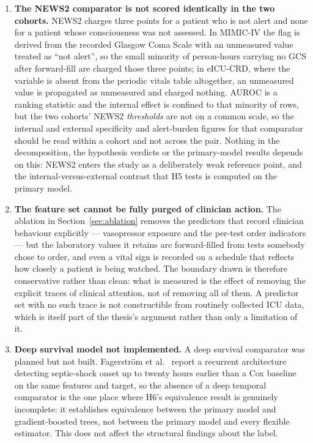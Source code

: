 \begin{enumerate}
    \item \textbf{The NEWS2 comparator is not scored identically in the two
    cohorts.} NEWS2 charges three points for a patient who is not alert and
    none for a patient whose consciousness was not assessed. In MIMIC-IV the
    flag is derived from the recorded Glasgow Coma Scale with an unmeasured
    value treated as ``not alert'', so the small minority of person-hours
    carrying no GCS after forward-fill are charged those three points; in
    eICU-CRD, where the variable is absent from the periodic vitals table
    altogether, an unmeasured value is propagated as unmeasured and charged
    nothing. AUROC is a ranking statistic and the internal effect is confined
    to that minority of rows, but the two cohorts' NEWS2 \emph{thresholds} are
    not on a common scale, so the internal and external specificity and
    alert-burden figures for that comparator should be read within a cohort and
    not across the pair. Nothing in the decomposition, the hypothesis verdicts
    or the primary-model results depends on this: NEWS2 enters the study as a
    deliberately weak reference point, and the internal-versus-external
    contrast that H5 tests is computed on the primary model.

    \item \textbf{The feature set cannot be fully purged of clinician action.}
    The ablation in Section~\ref{sec:ablation} removes the
    \pcAblNDropped{} predictors that record clinician behaviour explicitly ---
    vasopressor exposure and the per-test order indicators --- but the
    laboratory values it retains are forward-filled from tests somebody chose
    to order, and even a vital sign is recorded on a schedule that reflects how
    closely a patient is being watched. The boundary drawn is therefore
    conservative rather than clean: what is measured is the effect of removing
    the explicit traces of clinical attention, not of removing all of them. A
    predictor set with no such trace is not constructible from routinely
    collected ICU data, which is itself part of the thesis's argument rather
    than only a limitation of it.

    \item \textbf{Deep survival model not implemented.} A deep survival
    comparator was planned but not built. Fagerstr{\"o}m et al.\
    \cite{fagerstrom2019lisep} report a recurrent architecture detecting
    septic-shock onset up to twenty hours earlier than a Cox baseline on the
    same features and target, so the absence of a deep temporal comparator is
    the one place where H6's equivalence result is genuinely incomplete: it
    establishes equivalence between the primary model and gradient-boosted
    trees, not between the primary model and every flexible estimator. This
    does not affect the structural findings about the label.


\end{enumerate}
